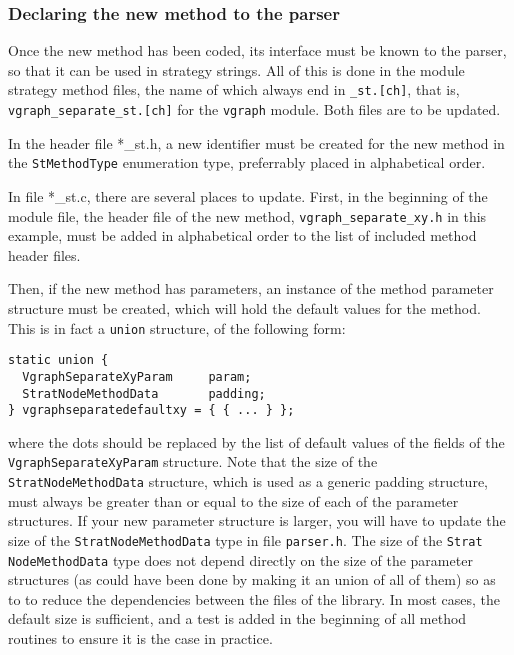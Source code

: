 \subsubsection{Declaring the new method to the parser}

Once the new method has been coded, its interface must be known to the
parser, so that it can be used in strategy strings. All of this is
done in the module strategy method files, the name of which always end
in \texttt{\_st.[ch]}, that is, \texttt{vgraph\_\lbt separate\_\lbt st.[ch]}
for the \texttt{vgraph} module. Both files are to be updated.

In the header file {*\_st.h}, a new identifier must be created for the
new method in the \texttt{St\lbt Method\lbt Type} enumeration type,
preferrably placed in alphabetical order.

In file {*\_st.c}, there are several places to update.
First, in the beginning of the module file, the header file of the new
method, \texttt{vgraph\_\lbt separate\_\lbt xy.h} in this example,
must be added in alphabetical order to the list of included method
header files.

Then, if the new method has parameters, an instance of the method
parameter structure must be created, which will hold the default
values for the method. This is in fact a \texttt{union} structure,
of the following form:
{\tt\begin{verbatim}
static union {
  VgraphSeparateXyParam     param;
  StratNodeMethodData       padding;
} vgraphseparatedefaultxy = { { ... } };
\end{verbatim}}
where the dots should be replaced by the list of default values of the
fields of the \texttt{Vgraph\lbt Separate\lbt Xy\lbt Param} structure.
Note that the size of the \texttt{Strat\lbt Node\lbt Method\lbt Data}
structure, which is used as a generic padding structure, must always
be greater than or equal to the size of each of the parameter
structures. If your new parameter structure is larger, you will have
to update the size of the \texttt{Strat\lbt Node\lbt Method\lbt Data}
type in file \texttt{parser.h}\enspace. The size of the \texttt{Strat\lbt
Node\lbt Method\lbt Data} type does not depend directly on the size of
the parameter structures (as could have been done by making it an union
of all of them) so as to to reduce the dependencies between the files
of the library. In most cases, the default size is sufficient, and a
test is added in the beginning of all method routines to ensure it is
the case in practice.

